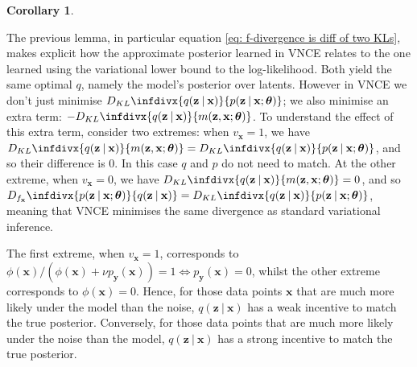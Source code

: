\documentclass[11pt, oneside]{article}
\newcommand{\thetab}{{\boldsymbol{\theta}}}
\newcommand{\pnn}{\phi}
\newcommand{\pnoise}{p_{ \mathbf y}}
\newcommand{\x}{{\mathbf x}}
\newcommand{\z}{{\mathbf z}}
\newcommand\given[1][]{\:#1\vert\:}
\newcommand{\infdiv}[1]{D_{#1}\infdivx}
\newtheorem{corollary}{Corollary}[theorem]
\theoremstyle{definition}
\begin{document}
\begin{corollary}
\label{corollary: f-divergence limit}
\end{corollary}
The previous lemma, in particular equation \ref{eq: f-divergence is diff of two KLs}, makes explicit how the approximate posterior learned in  VNCE relates to the one learned using the variational lower bound to the log-likelihood. Both yield the same optimal $q$, namely the model's posterior over latents. However in VNCE we don't just minimise $\infdiv{KL}{q(\z \given \x)}{p(\z \given \x; \thetab)}$; we also minimise an extra term: $-\infdiv{KL}{q(\z \given \x)}{m(\z, \x ; \thetab)}$. To understand the effect of this extra term, consider two extremes: when $v_{\x} = 1$, we have $\infdiv{KL}{q(\z \given \x)}{m(\z, \x ; \thetab)} = \infdiv{KL}{q(\z \given \x)}{p(\z \given \x; \thetab)}$, and so their difference is 0. In this case $q$ and $p$ do not need to match. At the other extreme, when $v_{\x} = 0$, we have $\infdiv{KL}{q(\z \given \x)}{m(\z, \x ; \thetab)} = 0$, and so $\infdiv{f_{\x}}{p(\z \given \x; \thetab)}{q(\z \given \x)} = \infdiv{KL}{q(\z \given \x)}{p(\z \given \x; \thetab)}$, meaning that VNCE minimises the same divergence as standard variational inference. 

The first extreme, when $v_{\x} = 1$, corresponds to $\pnn(\x)/(\pnn(\x) + \nu \pnoise(\x)) = 1 \Leftrightarrow \pnoise(\x) = 0$, whilst the other extreme corresponds to $\pnn(\x) = 0$. Hence, for those data points $\x$ that are much more likely under the model than the noise, $q(\z \given \x)$ has a weak incentive to match the true posterior. Conversely, for those data points that are much more likely under the noise than the model, $q(\z \given \x)$ has a strong incentive to match the true posterior.
\end{document}
